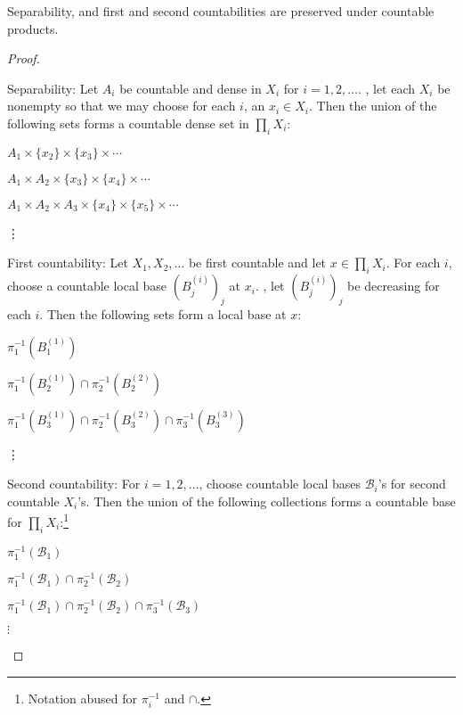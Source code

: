 	
	\begin{prp}
		Separability, and first and second countabilities are preserved under countable products.
	\end{prp}
	
	\begin{proof}
		\begin{mylist}
			\item Separability:
			Let $A_i$ be countable and dense in $X_i$ for $i = 1, 2, \ldots$. \Wlogg, let each $X_i$ be nonempty so that we may choose
			 for each $i$, an $x_i\in X_i$. Then the union of the following sets forms a countable dense set in $\prod_i X_i$:
			\begin{mylist}
				\item $A_1\times\{x_2\}\times\{x_3\}\times\cdots$
				\item $A_1\times A_2\times \{x_3\}\times\{x_4\}\times\cdots$
				\item $A_1\times A_2\times A_3\times \{x_4\}\times\{x_5\}\times\cdots$
				\item[\vdots] 
			\end{mylist}
			
			\item First countability:
			Let $X_1, X_2, \ldots$ be first countable and let $x\in \prod_i X_i$. For each $i$, choose a countable local base $(B^{(i)}_j)_j$ at $x_i$. \Wlogg, let $(B^{(i)}_j)_j$ be decreasing for each $i$. Then the following sets form a local base at $x$:
			\begin{mylist}
				\item $\pi_1^{-1}(B^{(1)}_1)$
				\item $\pi_1^{-1}(B^{(1)}_2)\cap \pi_2^{-1}(B^{(2)}_2)$
				\item $\pi_1^{-1}(B^{(1)}_3)\cap \pi_2^{-1}(B^{(2)}_3)\cap \pi_3^{-1}(B^{(3)}_3)$
				\item[\vdots]
			\end{mylist}
			
			\item Second countability: 
			For $i = 1, 2, \ldots$, choose countable local bases $\mathscr B_i$'s for second countable $X_i$'s. Then the union of the following collections forms a countable base for $\prod_i X_i$:\footnote{Notation abused for $\pi_i^{-1}$ and $\cap$.}
			\begin{mylist}
				\item $\pi_1^{-1}(\mathscr B_1)$
				\item $\pi_1^{-1}(\mathscr B_1)\cap\pi_2^{-1}(\mathscr B_2)$
				\item $\pi_1^{-1}(\mathscr B_1)\cap\pi_2^{-1}(\mathscr B_2)\cap\pi_3^{-1}(\mathscr B_3)$
				\item[$\vdots$]\qedhere
			\end{mylist}
		\end{mylist}
	\end{proof}
	

